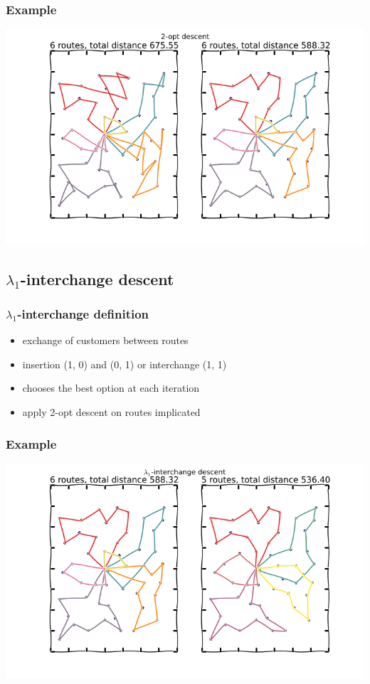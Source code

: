 \documentclass{beamer}
\begin{document}
\begin{frame}
\frametitle{Example}
\begin{center}
\includegraphics[scale=0.4]{figs/2opt}

\end{center}
\end{frame}


\subsection{$\lambda_1$-interchange descent}

\begin{frame}
\frametitle{$\lambda_1$-interchange definition}
\begin{itemize}
	\item exchange of customers between routes
	\item insertion (1, 0) and (0, 1) or interchange (1, 1)
	\item chooses the best option at each iteration
	\item apply 2-opt descent on routes implicated
\end{itemize}
\end{frame}


\begin{frame}
\frametitle{Example}
\begin{center}
\includegraphics[scale=0.4]{figs/lambda}

\end{center}
\end{frame}
\end{document}
